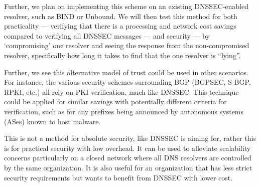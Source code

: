 Further, we plan on implementing this scheme on an existing 
DNSSEC-enabled resolver, such as BIND or Unbound. 
We will then test this method for both
practicality --- verifying that there is a processing and network  cost savings 
compared to verifying all DNSSEC messages --- and security --- by `compromising'
one resolver and seeing the response from the non-compromised resolver, 
specifically how long it takes to find that the one resolver is ``lying''.

Further, we see this alternative model of trust could be used in other 
scenarios. For instance, the various security schemes surrounding BGP (BGPSEC, 
S-BGP, RPKI, etc.) all rely on PKI verification, much like DNSSEC. This 
technique could be applied for similar savings with potentially different 
criteria for verification, such as for any prefixes being announced by 
autonomous systems (ASes) known to host malware. 

This is not a method for absolute security, like DNSSEC is aiming for, rather 
this is for practical security with low overhead. It can be used to alleviate
scalability concerns particularly on a closed network where all DNS resolvers are
controlled by the same organization. It is also useful for an organization that
has less strict security requirements but wants to benefit from DNSSEC with 
lower cost.

